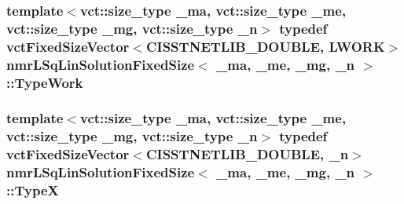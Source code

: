 \subsubsection[{Type\+Work}]{\setlength{\rightskip}{0pt plus 5cm}template$<$vct\+::size\+\_\+type \+\_\+ma, vct\+::size\+\_\+type \+\_\+me, vct\+::size\+\_\+type \+\_\+mg, vct\+::size\+\_\+type \+\_\+n$>$ typedef {\bf vct\+Fixed\+Size\+Vector}$<$C\+I\+S\+S\+T\+N\+E\+T\+L\+I\+B\+\_\+\+D\+O\+U\+B\+L\+E, {\bf L\+W\+O\+R\+K}$>$ {\bf nmr\+L\+Sq\+Lin\+Solution\+Fixed\+Size}$<$ \+\_\+ma, \+\_\+me, \+\_\+mg, \+\_\+n $>$\+::{\bf Type\+Work}}\label{classnmr_l_sq_lin_solution_fixed_size_a2804f3b3815a82a0f9655bcd2f86e7e4}
\hypertarget{classnmr_l_sq_lin_solution_fixed_size_aa00d3b54073dac6aba6e3793d4f88348}{}
\subsubsection[{Type\+X}]{\setlength{\rightskip}{0pt plus 5cm}template$<$vct\+::size\+\_\+type \+\_\+ma, vct\+::size\+\_\+type \+\_\+me, vct\+::size\+\_\+type \+\_\+mg, vct\+::size\+\_\+type \+\_\+n$>$ typedef {\bf vct\+Fixed\+Size\+Vector}$<$C\+I\+S\+S\+T\+N\+E\+T\+L\+I\+B\+\_\+\+D\+O\+U\+B\+L\+E, \+\_\+n$>$ {\bf nmr\+L\+Sq\+Lin\+Solution\+Fixed\+Size}$<$ \+\_\+ma, \+\_\+me, \+\_\+mg, \+\_\+n $>$\+::{\bf Type\+X}}\label{classnmr_l_sq_lin_solution_fixed_size_aa00d3b54073dac6aba6e3793d4f88348}


